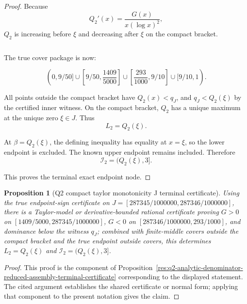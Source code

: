 \documentclass[11pt]{article}
\numberwithin{equation}{section}
\newtheorem{proposition}[theorem]{Proposition}
\theoremstyle{definition}
\theoremstyle{remark}
\newcommand{\1}{\mathbf 1}
\begin{document}
\begin{proof}
Because
\[
Q_2'(x)=\frac{G(x)}{x(\log x)^2},
\]
\(Q_2\) is increasing before \(\xi\) and decreasing after \(\xi\) on the compact bracket.


\begin{verbatim}
\end{verbatim}

The true cover package is now:

\[
(0,9/50]\cup
\left[9/50,\frac{1409}{5000}\right]\cup
\left[\frac{293}{1000},9/10\right]\cup
[9/10,1).
\]

All points outside the compact bracket have \(Q_2(x)<q_J\), and \(q_J<Q_2(\xi)\) by the certified inner witness. On the compact bracket, \(Q_2\) has a unique maximum at the unique zero \(\xi\in J\). Thus
\[
L_2=Q_2(\xi).
\]

At \(\beta=Q_2(\xi)\), the defining inequality has equality at \(x=\xi\), so the lower endpoint is excluded. The known upper endpoint remains included. Therefore
\[
\mathcal I_2=(Q_2(\xi),3].
\]

This proves the terminal exact endpoint node.
\end{proof}

\begin{proposition}[Q2 compact taylor monotonicity J terminal certificate]
\label{res:q2-compact-taylor-monotonicity-j-terminal-certificate}
Using the true endpoint-sign certificate on \(J=[287345/1000000,287346/1000000]\), there is a Taylor-model or derivative-bounded rational certificate proving \(G>0\) on \([1409/5000,287345/1000000]\), \(G<0\) on \([287346/1000000,293/1000]\), and dominance below the witness \(q_J\); combined with finite-middle covers outside the compact bracket and the true endpoint outside covers, this determines \(L_2=Q_2(\xi)\) and \(\mathcal I_2=(Q_2(\xi),3]\).
\end{proposition}

\begin{proof}
This proof is the component of Proposition~\ref{res:q2-analytic-denominator-reduced-assembly-terminal-certificate} corresponding to the displayed statement.  The cited argument establishes the shared certificate or normal form; applying that component to the present notation gives the claim.
\end{proof}
\end{document}
